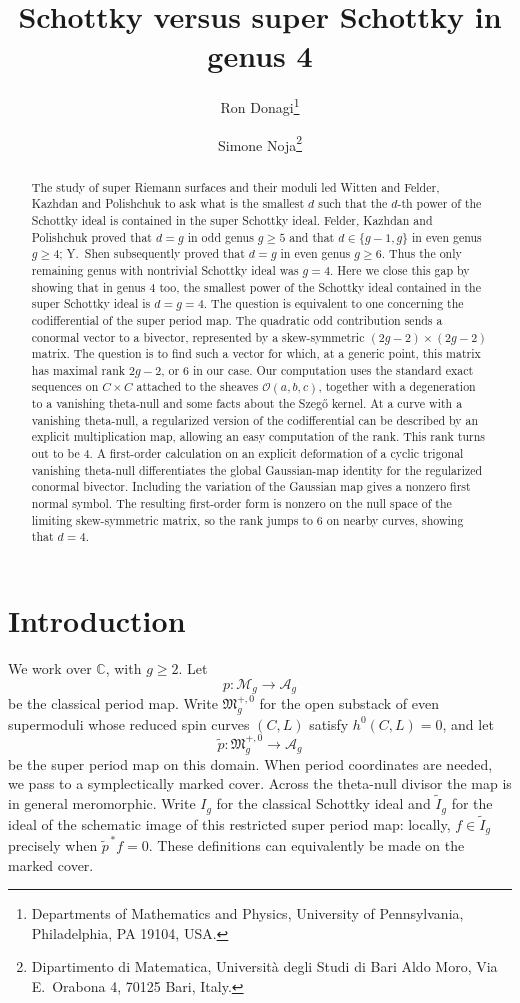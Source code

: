 \documentclass[11pt]{article}
\title{Schottky versus super Schottky in genus 4}
\author{
Ron Donagi\thanks{Departments of Mathematics and Physics, University of Pennsylvania,
Philadelphia, PA 19104, USA.}
\and
Simone Noja\thanks{Dipartimento di Matematica, Universit\`a degli Studi di
Bari Aldo Moro, Via E.~Orabona 4, 70125 Bari, Italy.}}
\date{}
\newcommand{\OO}{\mathcal O}
\newcommand{\MM}{\mathcal M}
\newcommand{\FM}{\mathfrak M}
\newcommand{\Aa}{\mathcal A}
\begin{document}
\maketitle
\tableofcontents

\begin{abstract}
The study of super Riemann surfaces and their moduli led Witten and Felder, Kazhdan and Polishchuk to ask what is the smallest
$d$ such that the $d$-th power of the Schottky ideal is contained in the super Schottky ideal.
Felder, Kazhdan and Polishchuk proved that $d=g$ in odd genus $g\geq5$ and that $d\in\{g-1,g\}$ in even genus $g\geq4$; Y.~Shen subsequently proved that $d=g$ in even genus $g\geq6$.  Thus the only remaining genus with nontrivial Schottky ideal was $g=4$.
Here we close this gap by showing that in genus $4$ too, the smallest power of the Schottky ideal contained in the super
Schottky ideal is $d=g=4$. The question is equivalent to one concerning the codifferential of the super period map.
{The quadratic odd contribution sends a conormal vector to a bivector,
represented by a skew-symmetric $(2g-2)\times(2g-2)$ matrix.
The question is to find such a vector for which, at a generic point,
this matrix has maximal rank $2g-2$, or $6$ in our case.}
Our computation uses the standard exact sequences on $C\times C$ attached to
the sheaves $\OO(a,b,c)$, together with a degeneration to a vanishing theta-null and some facts about the Szeg\H{o} kernel.
At a curve with a vanishing theta-null, a regularized version of the codifferential can be described by an explicit multiplication map,
allowing an easy computation of the rank. This rank turns out to be $4$.
{A first-order calculation on an explicit deformation of a cyclic trigonal
vanishing theta-null differentiates the global Gaussian-map identity for the
regularized conormal bivector. Including the variation of the Gaussian map
gives a nonzero first normal symbol.}
The resulting first-order form is nonzero on the null space of the limiting skew-symmetric matrix,
so the rank jumps to $6$ on nearby curves, showing that $d=4$.
\end{abstract}

\section{Introduction}


We work over $\mathbb C$, with $g\geq2$. Let
\[
p:\MM_g\to\Aa_g
\]
be the classical period map. Write $\FM_g^{+,0}$ for the open substack
of even supermoduli whose reduced spin curves $(C,L)$ satisfy
$h^0(C,L)=0$, and let
\[
\widetilde p:\FM_g^{+,0}\longrightarrow\Aa_g
\]
be the super period map on this domain. When period coordinates are
needed, we pass to a symplectically marked cover. Across the theta-null
divisor the map is in general meromorphic.
Write $I_g$ for the classical Schottky ideal and $\widetilde I_g$ for
the ideal of the schematic image of this restricted super period map:
locally, $f\in\widetilde I_g$ precisely when $\widetilde p^{\,*}f=0$.
These definitions can equivalently be made on the marked cover.
\end{document}
